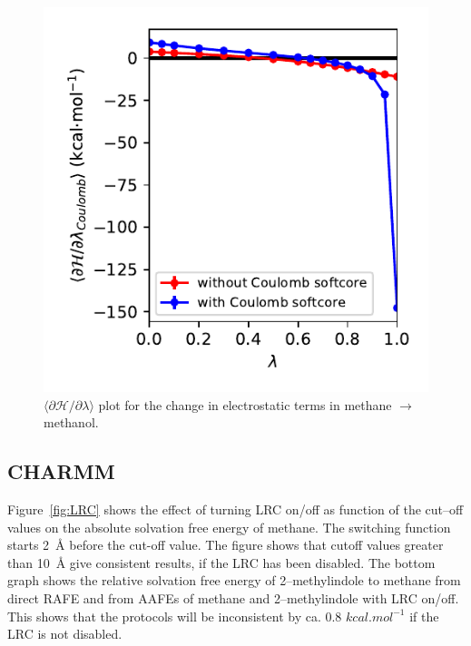 \documentclass[journal=jctcce,manuscript=suppinfo]{achemso}
\begin{document}
\begin{figure}[ht]
  \includegraphics{figures/TI_plot.pdf}
  \caption{$\langle\partial\mathscr{H}/\partial\lambda\rangle$ plot for the 
  change in electrostatic terms in methane $\rightarrow$ methanol.}
  \label{fig:gro_sc_eff}
\end{figure}

\subsection{CHARMM}
\label{sec:charmm-probs}

Figure~\ref{fig:LRC} shows the effect of turning LRC on/off as function of the cut--off values on the absolute solvation free energy of methane. The switching function starts \SI{2}{\angstrom} before the cut-off value. The figure shows that cutoff values greater than \SI{10}{\angstrom} give consistent results, if the LRC has been disabled. The bottom graph shows the relative solvation
free energy of 2--methylindole to methane from direct RAFE and from AAFEs of methane and 2--methylindole with LRC on/off. This shows that the protocols will be inconsistent by ca. 0.8 $kcal.mol^{-1}$ if the LRC is not disabled.
\end{document}

